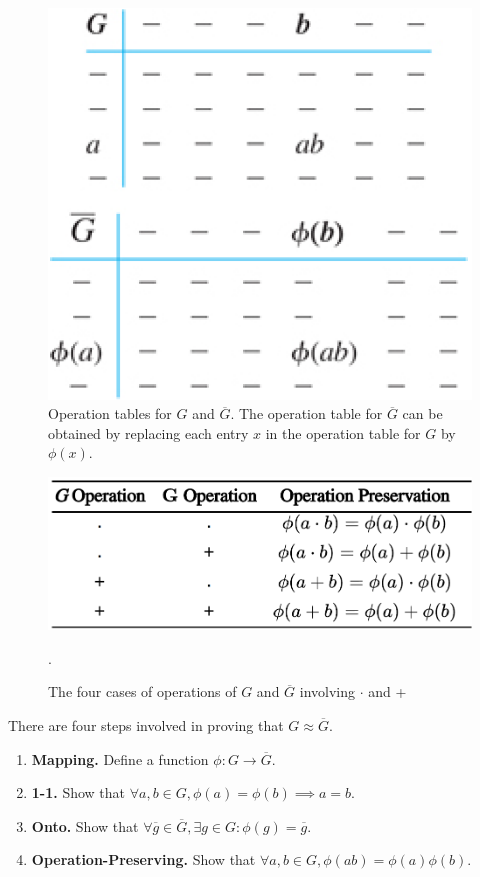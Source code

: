 \documentclass{article}
\theoremstyle{definition}
\begin{document}
 \begin{figure}[!htbp]
     \centering
     \includegraphics[width=0.4\linewidth]{figures/isomophism_table.png}
     \caption{Operation tables for $G$ and $\overline{G}$. The operation table for $\overline{G}$ can be obtained by replacing each entry $x$ in the operation table for $G$ by $\phi(x)$.}
     \label{isomophism_operation_tables}
 \end{figure}
 
 \begin{figure}[!htbp]
     \centering
     \includegraphics[width=0.7\linewidth]{figures/isomophism_operations.png}
     \caption{The four cases of operations of $G$ and $\overline{G}$ involving $\cdot$ and +}.
     \label{isomorphism_operations}
 \end{figure}
 
 There are four steps involved in proving that $G \approx \overline{G}$.
 \begin{enumerate}
     \item \textbf{Mapping.} Define a function $\phi: G \to \overline{G}$.
     \item \textbf{1-1.} Show that $\forall a,b \in G, \phi(a) = \phi(b) \implies a=b$.
     \item \textbf{Onto.} Show that $\forall \overline{g} \in \overline{G}, \exists g \in G: \phi(g)=\overline{g}$.
     \item \textbf{Operation-Preserving.} Show that $\forall a,b \in G, 
     \phi(ab) = \phi(a)\phi(b)$.
 \end{enumerate}
 
\end{document}
